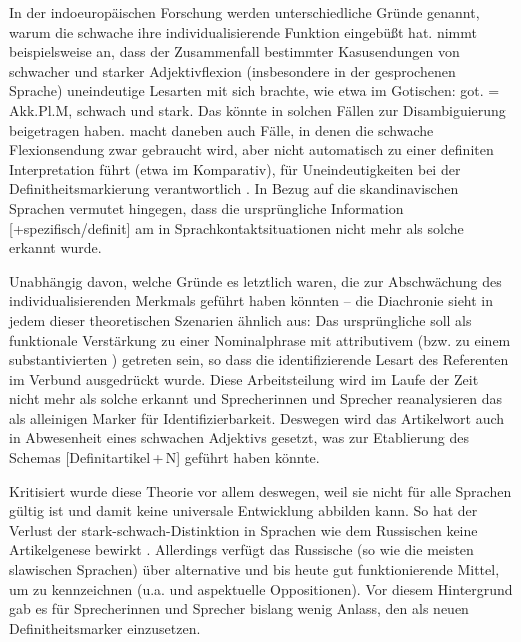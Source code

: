 In der indoeuropäischen Forschung werden unterschiedliche Gründe genannt, warum die schwache  ihre individualisierende Funktion eingebüßt hat. \textcite[24]{Kovari1984} nimmt beispielsweise an, dass der Zusammenfall bestimmter Kasusendungen  von schwacher und starker Adjektivflexion   (insbesondere in der gesprochenen Sprache) uneindeutige Lesarten mit sich brachte, wie etwa im Gotischen: got.  = Akk.Pl.M, schwach und stark. Das  könnte in solchen Fällen zur Disambiguierung beigetragen haben.
\textcite[44]{Ebert1978} macht daneben \parencite[mit Verweis auf][]{Kuhn1955} auch Fälle, in denen die schwache Flexionsendung zwar gebraucht wird, aber nicht automatisch zu einer definiten Interpretation führt (etwa im Komparativ), für Uneindeutigkeiten bei der Definitheitsmarkierung  verantwortlich \parencite[vgl. zu dieser Argumentation auch][25]{Kovari1984}. In Bezug auf die skandinavischen Sprachen vermutet \textcite{Braunmuller2013} hingegen, dass die ursprüngliche Information [+spezifisch/definit] am  in Sprachkontaktsituationen nicht mehr als solche erkannt wurde. 

Unabhängig davon, welche Gründe es letztlich waren, die zur Abschwächung des individualisierenden Merkmals geführt haben könnten -- die Diachronie sieht in jedem dieser theoretischen Szenarien ähnlich aus: Das ursprüngliche  soll als funktionale Verstärkung zu einer Nominalphrase  mit attributivem  (bzw. zu einem substantivierten  ) getreten sein, so dass die identifizierende Lesart des Referenten im Verbund ausgedrückt wurde. Diese Arbeitsteilung wird im Laufe der Zeit nicht mehr als solche erkannt und Sprecherinnen und Sprecher reanalysieren  das  als alleinigen Marker für Identifizierbarkeit. Deswegen wird das Artikelwort auch in Abwesenheit eines schwachen Adjektivs   gesetzt, was zur Etablierung des Schemas  [Definitartikel\,+\,N]  geführt haben könnte.     

Kritisiert wurde diese Theorie vor allem deswegen, weil sie nicht für alle Sprachen gültig ist und damit keine universale Entwicklung abbilden kann. So hat der Verlust der stark-schwach-Distinktion in Sprachen wie dem Russischen keine Artikelgenese bewirkt \parencite[][64]{Philippi1997}. Allerdings verfügt das Russische (so wie die meisten slawischen Sprachen) über alternative und bis heute gut funktionierende Mittel, um  zu kennzeichnen (u.a.  und aspektuelle  Oppositionen). Vor diesem Hintergrund gab es für Sprecherinnen und Sprecher bislang wenig Anlass,  den  als neuen Definitheitsmarker  einzusetzen.

